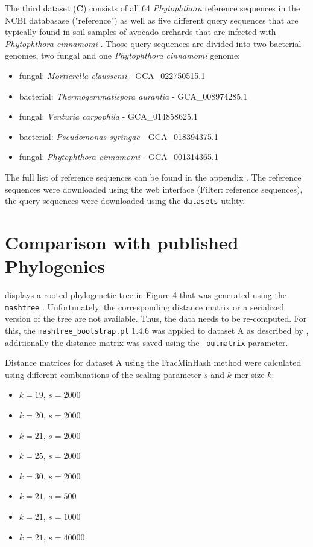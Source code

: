 The third dataset (\textbf{C}) consists of all 64 \textit{Phytophthora}
reference sequences in the NCBI databasase ("reference") as well as five
different query sequences that are typically found in soil samples of avocado
orchards that are infected with \textit{Phytophthora cinnamomi}
\cite{solis-garciaPhytophthoraRootRot2020}. Those query sequences are divided
into two bacterial genomes, two fungal and one \textit{Phytophthora cinnamomi}
genome:

\begin{itemize}
  \item fungal: \textit{Mortierella claussenii} - GCA\_022750515.1
  \item bacterial: \textit{Thermogemmatispora aurantia} - GCA\_008974285.1
  \item fungal: \textit{Venturia carpophila} - GCA\_014858625.1
  \item bacterial: \textit{Pseudomonas syringae} - GCA\_018394375.1
  \item fungal: \textit{Phytophthora cinnamomi} - GCA\_001314365.1
\end{itemize}

The full list of reference sequences can be found in the appendix .
The reference sequences were downloaded using the web interface (Filter:
reference sequences), the query sequences were downloaded using the
\texttt{datasets} utility.



\section{Comparison with published Phylogenies}
\cite{mandalComparativeGenomeAnalysis2022} displays a rooted phylogenetic tree
in Figure 4 that was generated using the \texttt{mashtree}
\cite{katzMashtreeRapidComparison2019,ondovMashFastGenome2016}. Unfortunately,
the corresponding distance matrix or a serialized version of the tree are not
available. Thus, the data needs to be re-computed. For this, the
\texttt{mashtree\_bootstrap.pl} 1.4.6 was applied to dataset A as described by
\cite{mandalComparativeGenomeAnalysis2022}, additionally the distance matrix was
saved using the \texttt{--outmatrix} parameter.

Distance matrices for dataset A using the FracMinHash method were calculated using different
combinations of the scaling parameter $s$ and $k$-mer size $k$:

\begin{itemize}
  \item $k=19$, $s=2000$
  \item $k=20$, $s=2000$
  \item $k=21$, $s=2000$
  \item $k=25$, $s=2000$
  \item $k=30$, $s=2000$
  \item $k=21$, $s=500$
  \item $k=21$, $s=1000$
  \item $k=21$, $s=40000$
\end{itemize}

